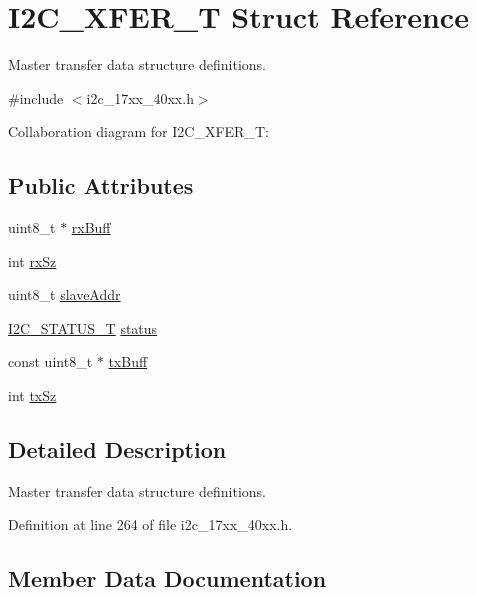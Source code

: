 \hypertarget{structI2C__XFER__T}{}\section{I2\+C\+\_\+\+X\+F\+E\+R\+\_\+T Struct Reference}
\label{structI2C__XFER__T}


Master transfer data structure definitions.  




{\ttfamily \#include $<$i2c\+\_\+17xx\+\_\+40xx.\+h$>$}



Collaboration diagram for I2\+C\+\_\+\+X\+F\+E\+R\+\_\+T\+:
\subsection*{Public Attributes}
\begin{DoxyCompactItemize}
\item 
uint8\+\_\+t $\ast$ \hyperlink{structI2C__XFER__T_a905dce25e8fc1dc85c4b76e789f62623}{rx\+Buff}
\item 
int \hyperlink{structI2C__XFER__T_a8c5b062847cfd0fe9b27058743de8aa5}{rx\+Sz}
\item 
uint8\+\_\+t \hyperlink{structI2C__XFER__T_a39393422071ba7bca5d22e15b110e723}{slave\+Addr}
\item 
\hyperlink{group__I2C__17XX__40XX_ga21aa839302786105dcf6a96be0e6e8bc}{I2\+C\+\_\+\+S\+T\+A\+T\+U\+S\+\_\+T} \hyperlink{structI2C__XFER__T_aefc3cfe9bf7cdaeb2a632c42250602ad}{status}
\item 
const uint8\+\_\+t $\ast$ \hyperlink{structI2C__XFER__T_a673ce41b59a715c6e91e3d041885554b}{tx\+Buff}
\item 
int \hyperlink{structI2C__XFER__T_a6ff8668411b06d3dc4ab9d942ffca896}{tx\+Sz}
\end{DoxyCompactItemize}


\subsection{Detailed Description}
Master transfer data structure definitions. 

Definition at line 264 of file i2c\+\_\+17xx\+\_\+40xx.\+h.



\subsection{Member Data Documentation}
